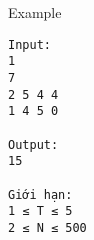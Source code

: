 Example
\begin{verbatim}
Input:
1
7
2 5 4 4
1 4 5 0

Output:
15

Giới hạn:
1 ≤ T ≤ 5 
2 ≤ N ≤ 500 
\end{verbatim}